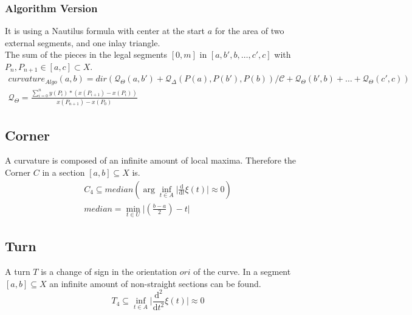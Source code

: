 \documentclass{report}
\begin{document}
\subsubsection{Algorithm Version}
It is using a Nautilus formula with center at the start $a$ for the area of two external segments, and one inlay triangle.\\
The sum of the pieces in the legal segments $[0,m]$ in $[a,b',b,\ldots,c',c]$ with $P_{n}, P_{n+1} \in [a,c] \subset X$.
\begin{align}
curvature_{Algo}(a,b)=dir(\mathcal{Q}_{\Theta}(a,b')+\mathcal{Q}_{\Delta}(P(a),P(b'),P(b))/\mathcal{C}+\mathcal{Q}_{\Theta}(b',b)+\ldots+\mathcal{Q}_{\Theta}(c',c))\\
\mathcal{Q}_{\Theta}= \frac{\sum \limits _{i=0}^{n}y(P_{i})*(x(P_{i+1})-x(P_{i}))}{x(P_{n+1})-x(P_{0})}
\end{align}

\subsection{Corner}
A curvature is composed of an infinite amount of local maxima. Therefore the Corner $C$ in a section $[a,b] \subseteq X$ is.
\begin{align}
C_{4} \subseteq median(\arg \inf_{t \in A} \lvert \frac{\mathrm{d}}{\mathrm{d}t}\xi(t) \rvert \approx 0) \\
median = \min_{t \in U}\lvert(\frac{b-a}{2})-t\rvert
\end{align}

\subsection{Turn}
A turn $T$ is a change of sign in the orientation $ori$ of the curve. In a segment $[a,b] \subseteq X$ an infinite amount of non-straight sections can be found.
\begin{equation}
T_{4} \subseteq \inf_{t \in A} \lvert \frac{\mathrm{d}^2}{\mathrm{d}t^2}\xi(t) \rvert \approx 0
\end{equation}
\end{document}
